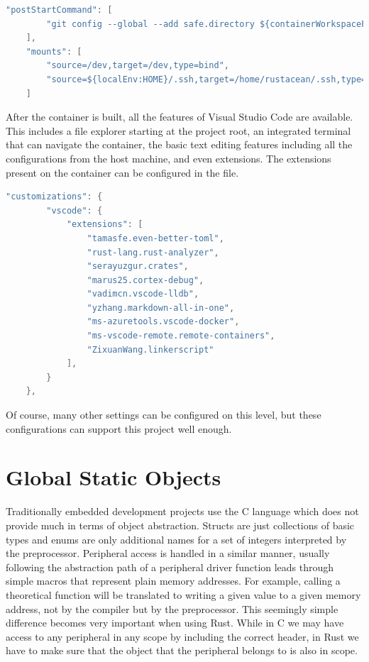 \begin{lstlisting}[language=C,frame=single,float=!ht,label={lst:devcont-posttart},caption={Post Start Commands and Mounts}]
    "postStartCommand": [
        "git config --global --add safe.directory ${containerWorkspaceFolder}"
    ],
    "mounts": [
        "source=/dev,target=/dev,type=bind",
        "source=${localEnv:HOME}/.ssh,target=/home/rustacean/.ssh,type=bind,consistency=cached"
    ]
\end{lstlisting}


After the container is built, all the features of Visual Studio Code are available. This includes a file explorer starting at the project root, an integrated terminal that can navigate the container, the basic text editing features including all the configurations from the host machine, and even extensions. The extensions present on the container can be configured in the  file.

\begin{lstlisting}[language=C,frame=single,float=!ht,label={lst:devcont-ext},caption={List of VSCode Extensions in the Container}]
    "customizations": {
        "vscode": {
            "extensions": [
                "tamasfe.even-better-toml",
                "rust-lang.rust-analyzer",
                "serayuzgur.crates",
                "marus25.cortex-debug",
                "vadimcn.vscode-lldb",
                "yzhang.markdown-all-in-one",
                "ms-azuretools.vscode-docker",
                "ms-vscode-remote.remote-containers",
                "ZixuanWang.linkerscript"
            ],
        }
    },
\end{lstlisting}

Of course, many other settings can be configured on this level, but these configurations can support this project well enough.

\section{Global Static Objects}

Traditionally embedded development projects use the C language which does not provide much in terms of object abstraction. Structs are just collections of basic types and enums are only additional names for a set of integers interpreted by the preprocessor. Peripheral access is handled in a similar manner, usually following the abstraction path of a peripheral driver function leads through simple macros that represent plain memory addresses. For example, calling a theoretical function  will be translated to writing a given value to a given memory address, not by the compiler but by the preprocessor. This seemingly simple difference becomes very important when using Rust. While in C we may have access to any peripheral in any scope by including the correct header, in Rust we have to make sure that the object that the peripheral belongs to is also in scope.

